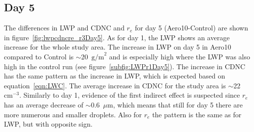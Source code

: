 \subsection{Day 5}
The differences in LWP and CDNC and $r_e$ for day 5 (Aero10-Control) are shown in figure~\ref{fig:lwpcdncre_r3Day5}. As for day 1, the LWP shows an average increase for the whole study area. The increase in LWP on day 5 in Aero10 compared to Control is $\sim$20~$\text{g/m}^2$ and is especially high where the LWP was also high in the control run (see figure~\ref{subfig:LWPr1Day5}). The increase in CDNC has the same pattern as the increase in LWP, which is expected based on equation~\ref{eqn:LWC}. The average increase in CDNC for the study area is $\sim$22~$\text{cm}^{-3}$. Similarly to day 1, evidence of the first indirect effect is suspected since $r_e$ has an average decrease of $\sim$0.6~$\mu\text{m}$, which means that still for day 5 there are more numerous and smaller droplets. Also for $r_e$ the pattern is the same as for LWP, but with opposite sign.
